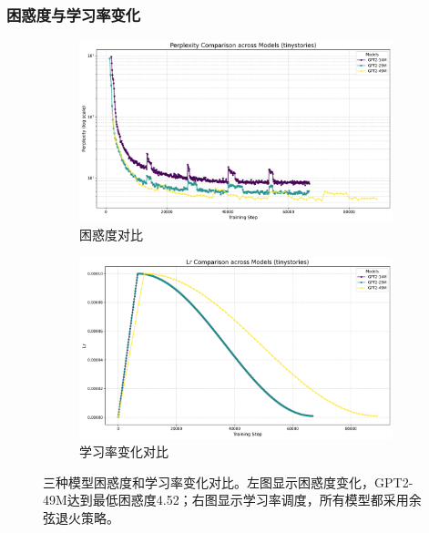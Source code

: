 \documentclass{article}
\begin{document}
\vspace{0.5cm}

\subsubsection{困惑度与学习率变化}
\begin{figure}[h]
\centering
\begin{subfigure}[b]{0.45\textwidth}
\includegraphics[width=\textwidth]{../visualize/metrics/perplexity_comparison.png}
\caption{困惑度对比}
\label{fig:perplexity}
\end{subfigure}
\hfill
\begin{subfigure}[b]{0.45\textwidth}
\includegraphics[width=\textwidth]{../visualize/metrics/lr_comparison.png}
\caption{学习率变化对比}
\label{fig:lr}
\end{subfigure}
\caption{三种模型困惑度和学习率变化对比。左图显示困惑度变化，GPT2-49M达到最低困惑度4.52；右图显示学习率调度，所有模型都采用余弦退火策略。}
\label{fig:perplexity_lr_comparison}
\end{figure}
\end{document}
